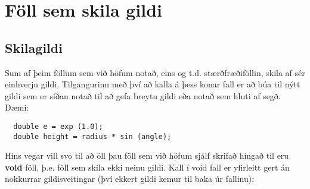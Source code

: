 





\chapter{Föll sem skila gildi}

\section{Skilagildi}

Sum af þeim föllum sem við höfum notað, eins og t.d. stærðfræðiföllin, skila af sér einhverju gildi.
Tilgangurinn með því að kalla á þess konar fall er að búa til nýtt gildi sem er síðan notað til að gefa breytu gildi eða notað sem hluti af segð.
Dæmi:


\begin{verbatim}
  double e = exp (1.0);
  double height = radius * sin (angle);
\end{verbatim}
%
Hins vegar vill svo til að öll þau föll sem við höfum sjálf skrifað hingað til eru {\bf void} föll, þ.e. föll sem skila ekki neinu gildi.
Kall í void fall er yfirleitt gert án nokkurrar gildisveitingar (því ekkert gildi kemur til baka úr fallinu):

